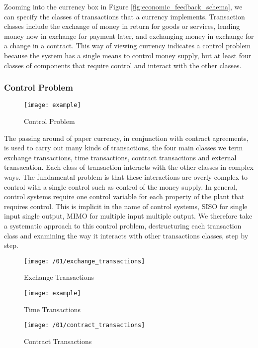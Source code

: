 Zooming into the currency box in Figure \ref{fig:economic_feedback_schema}, we can specify the
classes of transactions that a currency implements. Transaction classes include the exchange of
money in return for goods or services, lending money now in exchange for payment later, and
exchanging money in exchange for a change in a contract. This way of viewing currency indicates a
control problem because the system has a single means to control money supply, but at least four
classes of components that require control and interact with the other classes.

\subsubsection{Control Problem}

\begin{figure}
\centering
\texttt{[image: example]}
\caption{Control Problem}
\label{fig:control_problem}
\end{figure}

The passing around of paper currency, in conjunction with contract agreements, is used to carry
out many kinds of transactions, the four main classes we term exchange transactions, time
transactions, contract transactions and external transacation. Each class of transaction interacts
with the other classes in complex ways. The fundamental problem is that these interactions are
overly complex to control with a single control such as control of the money supply. In general,
control systems require one control variable for each property of the plant that requires control.
This is implicit in the name of control systems, SISO for single input single output, MIMO for
multiple input multiple output. We therefore take a systematic approach to this control problem,
destructuring each transaction class and examining the way it interacts with other transactions
classes, step by step.

\begin{figure}
\centering
\texttt{[image: /01/exchange\_transactions]}
\caption{Exchange Transactions}
\label{fig:exchange_transactions}
\end{figure}

\begin{figure}
\centering
\texttt{[image: example]}
\caption{Time Transactions}
\label{fig:time_transactions}
\end{figure}

\begin{figure}
\centering
\texttt{[image: /01/contract\_transactions]}
\caption{Contract Transactions}
\label{fig:contract_transactions}
\end{figure}

